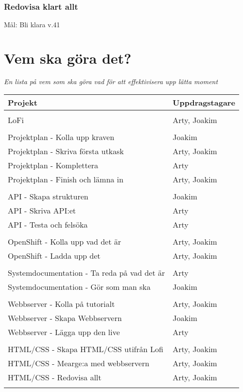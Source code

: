 \documentclass{TDP003mall}
\begin{document}
\subsubsection{Redovisa klart allt}
Mål: Bli klara v.41

\newpage





\section{Vem ska göra det?}
\textit{En lista på vem som ska göra vad för att effektivisera upp lätta moment}

\begin{table}[!h]
\begin{tabularx}{\linewidth}{|l|X|}

\hline
Projekt & Uppdragstagare \\\hline 
\\
LoFi & Arty, Joakim \\
\\
Projektplan - Kolla upp kraven & Joakim \\
Projektplan - Skriva första utkask & Arty, Joakim \\
Projektplan - Komplettera & Arty \\
Projektplan - Finish och lämna in & Arty, Joakim \\
\\
API - Skapa strukturen & Joakim \\
API - Skriva API:et & Arty \\
API - Testa och felsöka & Arty \\
\\
OpenShift - Kolla upp vad det är & Arty, Joakim \\
OpenShift - Ladda upp det & Arty, Joakim \\
\\
Systemdocumentation - Ta reda på vad det är & Arty \\
Systemdocumentation - Gör som man ska & Joakim \\
\\
Webbserver - Kolla på tutorialt & Arty, Joakim \\
Webbserver - Skapa Webbservern & Joakim \\
Webbserver - Lägga upp den live & Arty \\
\\
HTML/CSS - Skapa HTML/CSS utifrån Lofi & Arty, Joakim \\
HTML/CSS - Mearge:a med webbservern & Arty, Joakim \\
HTML/CSS - Redovisa allt & Arty, Joakim \\
\\
\hline 

\end{tabularx}
\end{table}
\end{document}
